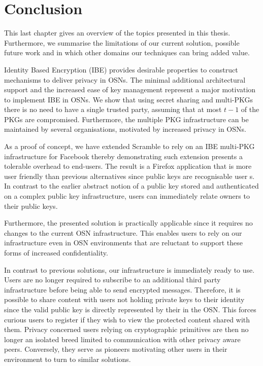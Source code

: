 \chapter{Conclusion}
\label{cha:conclusion}
This last chapter gives an overview of the topics presented in this thesis. Furthermore, we summarise the limitations of our current solution, possible future work and in which other domains our techniques can bring added value.

Identity Based Encryption (IBE) provides desirable properties to construct mechanisms to deliver privacy in OSNs. The minimal additional architectural support and the increased ease of key management represent a major motivation to implement IBE in OSNs. We show that using secret sharing and multi-PKGs there is no need to have a single trusted party, assuming that at most $t-1$ of the PKGs are compromised. Furthermore, the multiple PKG infrastructure can be maintained by several organisations, motivated by increased privacy in OSNs. 

As a proof of concept, we have extended Scramble to rely on an IBE multi-PKG infrastructure for Facebook thereby demonstrating such extension presents a tolerable overhead to end-users. The result is a Firefox application that is more user friendly than previous alternatives since public keys are recognisable user \id{}s. In contrast to the earlier abstract notion of a public key stored and authenticated on a complex public key infrastructure, users can immediately relate owners to their public keys. 

Furthermore, the presented solution is practically applicable since it requires no changes to the current OSN infrastructure. This enables users to rely on our infrastructure even in OSN environments that are reluctant to support these forms of increased confidentiality.

In contrast to previous solutions, our infrastructure is immediately ready to use. Users are no longer required to subscribe to an additional third party infrastructure before being able to send encrypted messages. Therefore, it is possible to share content with users not holding private keys to their identity since the valid public key is directly represented by their \id{} in the OSN. This forces curious users to register if they wish to view the protected content shared with them. Privacy concerned users relying on cryptographic primitives are then no longer an isolated breed limited to communication with other privacy aware peers. Conversely, they serve as pioneers motivating other users in their environment to turn to similar solutions.

